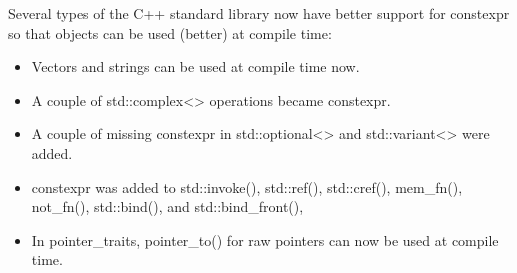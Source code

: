 Several types of the C++ standard library now have better support for constexpr so that objects can be used (better) at compile time:

\begin{itemize}
\item 
Vectors and strings can be used at compile time now.

\item 
A couple of std::complex<> operations became constexpr.

\item 
A couple of missing constexpr in std::optional<> and std::variant<> were added.

\item 
constexpr was added to std::invoke(), std::ref(), std::cref(), mem\_fn(), not\_fn(), std::bind(), and std::bind\_front(),

\item 
In pointer\_traits, pointer\_to() for raw pointers can now be used at compile time.
\end{itemize}
















